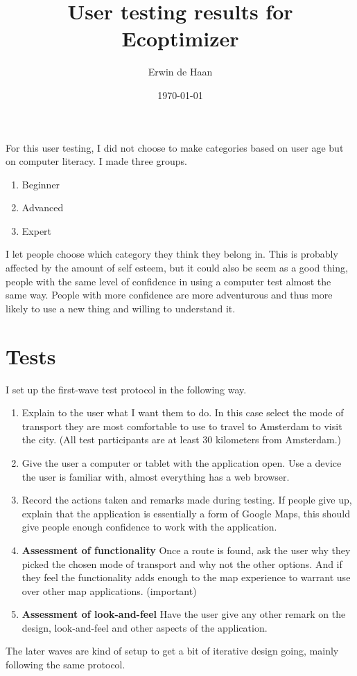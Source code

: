 \documentclass[final,a4paper,11pt]{article}
\author{Erwin de Haan}
\title{User testing results for Ecoptimizer}
\date{\today}
\begin{document}
\maketitle
For this user testing, I did not choose to make categories based on user age but on computer literacy. I made three groups.
\begin{enumerate}
\item Beginner
\item Advanced
\item Expert
\end{enumerate}
I let people choose which category they think they belong in. This is probably affected by the amount of self esteem, but it could also be seem as a good thing, people with the same level of confidence in using a computer test almost the same way. People with more confidence are more adventurous and thus more likely to use a new thing and willing to understand it.
\section*{Tests}
I set up the first-wave test protocol in the following way.
\begin{enumerate}
\item Explain to the user what I want them to do. In this case select the mode of transport they are most comfortable to use to travel to Amsterdam to visit the city. (All test participants are at least 30 kilometers from Amsterdam.)
\item Give the user a computer or tablet with the application open. Use a device the user is familiar with, almost everything has a web browser.
\item Record the actions taken and remarks made during testing. If people give up, explain that the application is essentially a form of Google Maps, this should give people enough confidence to work with the application.
\item \textbf{Assessment of functionality} Once a route is found, ask the user why they picked the chosen mode of transport and why not the other options. And if they feel the functionality adds enough to the map experience to warrant use over other map applications. (important)
\item \textbf{Assessment of look-and-feel} Have the user give any other remark on the design, look-and-feel and other aspects of the application.
\end{enumerate}
The later waves are kind of setup to get a bit of iterative design going, mainly following the same protocol.
\end{document}

